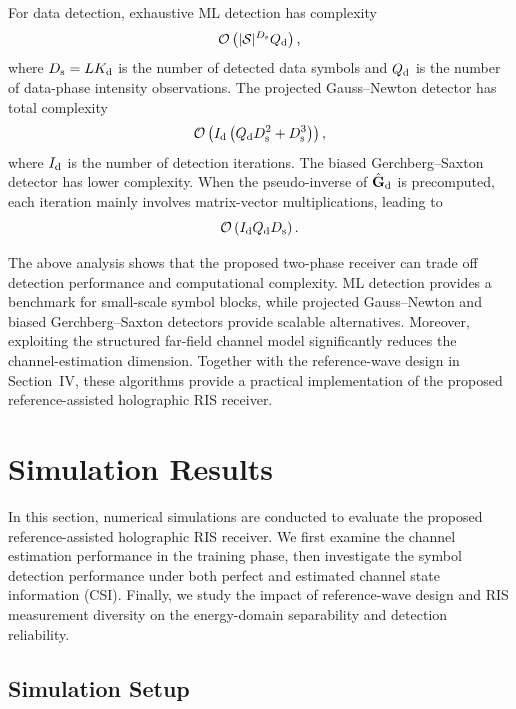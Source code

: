 \documentclass[journal]{IEEEtran}
\begin{document}
For data detection, exhaustive ML detection has complexity
\begin{equation}
\mathcal{O}
\left(
|\mathcal{S}|^{D_{\rm s}}Q_{\rm d}
\right),
\label{eq:ml_total_complexity}
\end{equation}
where $D_{\rm s}=LK_{\rm d}$ is the number of detected data symbols and $Q_{\rm d}$ is the number of data-phase intensity observations. 
The projected Gauss--Newton detector has total complexity
\begin{equation}
\mathcal{O}
\left(
I_{\rm d}
\left(
Q_{\rm d}D_{\rm s}^{2}
+
D_{\rm s}^{3}
\right)
\right),
\label{eq:gn_detection_total_complexity}
\end{equation}
where $I_{\rm d}$ is the number of detection iterations. 
The biased Gerchberg--Saxton detector has lower complexity. 
When the pseudo-inverse of $\hat{\mathbf{G}}_{\rm d}$ is precomputed, each iteration mainly involves matrix-vector multiplications, leading to
\begin{equation}
\mathcal{O}
\left(
I_{\rm d}Q_{\rm d}D_{\rm s}
\right).
\label{eq:gs_detection_total_complexity}
\end{equation}

The above analysis shows that the proposed two-phase receiver can trade off detection performance and computational complexity. 
ML detection provides a benchmark for small-scale symbol blocks, while projected Gauss--Newton and biased Gerchberg--Saxton detectors provide scalable alternatives. 
Moreover, exploiting the structured far-field channel model significantly reduces the channel-estimation dimension. 
Together with the reference-wave design in Section~IV, these algorithms provide a practical implementation of the proposed reference-assisted holographic RIS receiver.

\section{Simulation Results}

In this section, numerical simulations are conducted to evaluate the proposed reference-assisted holographic RIS receiver. 
We first examine the channel estimation performance in the training phase, then investigate the symbol detection performance under both perfect and estimated channel state information (CSI). 
Finally, we study the impact of reference-wave design and RIS measurement diversity on the energy-domain separability and detection reliability.

\subsection{Simulation Setup}
\end{document}
